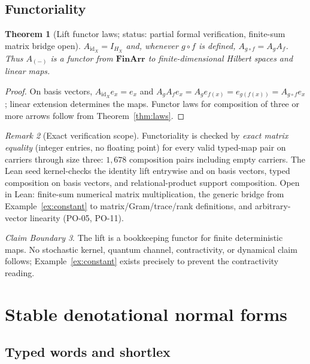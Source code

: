\documentclass[11pt]{amsart}
\newtheorem{theorem}{Theorem}[section]
\theoremstyle{definition}
\theoremstyle{remark}
\newtheorem{remark}[theorem]{Remark}
\newtheorem{boundary}[theorem]{Claim Boundary}
\newcommand{\id}{\mathrm{id}}
\newcommand{\FinArr}{\mathbf{FinArr}}
\begin{document}
\subsection{Functoriality}

\begin{theorem}[Lift functor laws; \textnormal{status: partial formal verification, finite-sum matrix bridge open}]\label{thm:functor}
$A_{\id_X}=I_{H_X}$ and, whenever $g\circ f$ is defined, $A_{g\circ f}=A_gA_f$. Thus $A_{(-)}$ is a functor from $\FinArr$ to finite-dimensional Hilbert spaces and linear maps.
\end{theorem}

\begin{proof}
On basis vectors, $A_{\id_X}e_x=e_x$ and $A_gA_fe_x=A_ge_{f(x)}=e_{g(f(x))}=A_{g\circ f}e_x$; linear extension determines the maps. Functor laws for composition of three or more arrows follow from Theorem~\ref{thm:laws}.
\end{proof}

\begin{remark}[Exact verification scope]
Functoriality is checked by \emph{exact matrix equality} (integer entries, no floating point) for every valid typed-map pair on carriers through size three: $1{,}678$ composition pairs including empty carriers. The Lean seed kernel-checks the identity lift entrywise and on basis vectors, typed composition on basis vectors, and relational-product support composition. Open in Lean: finite-sum numerical matrix multiplication, the generic bridge from Example~\ref{ex:constant} to matrix/Gram/trace/rank definitions, and arbitrary-vector linearity (PO-05, PO-11).
\end{remark}

\begin{boundary}
The lift is a bookkeeping functor for finite deterministic maps. No stochastic kernel, quantum channel, contractivity, or dynamical claim follows; Example~\ref{ex:constant} exists precisely to prevent the contractivity reading.
\end{boundary}

\section{Stable denotational normal forms}\label{sec:nf}

\subsection{Typed words and shortlex}
\end{document}
